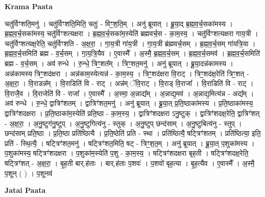 \documentclass[17pt]{extarticle}
\begin{document}
\textbf{Krama Paata} \newline

चतु॑र्विꣳशति॒मनु॑ । चतु॑र्विꣳशति॒मिति॒ चतुः॑ - विꣳ॒॒श॒ति॒म् । अनु॑ ब्रूयात् । ब्रू॒या॒द् ब्र॒ह्म॒व॒र्च॒सका॑मस्य । ब्र॒ह्म॒व॒र्च॒सका॑मस्य॒ चतु॑र्विꣳशत्यक्षरा । ब्र॒ह्म॒व॒र्च॒सका॑म॒स्येति॑ ब्रह्मवर्च॒स - का॒म॒स्य॒ । चतु॑र्विꣳशत्यक्षरा गाय॒त्री । चतु॑र्विꣳशत्यक्ष॒रेति॒ चतु॑र्विꣳशति - अ॒क्ष॒रा॒ । गा॒य॒त्री गा॑य॒त्री । गा॒य॒त्री ब्र॑ह्मवर्च॒सम् । ब्र॒ह्म॒व॒र्च॒सम् गा॑यत्रि॒या । ब्र॒ह्म॒व॒र्च॒समिति॑ ब्रह्म - व॒र्च॒सम् । गा॒य॒त्रि॒यैव । ए॒वास्मै᳚ । अ॒स्मै॒ ब्र॒ह्म॒व॒र्च॒सम् । ब्र॒ह्म॒व॒र्च॒समव॑ । ब्र॒ह्म॒व॒र्च॒समिति॑ ब्रह्म - व॒र्च॒सम् । अव॑ रुन्धे । रु॒न्धे॒ त्रिꣳ॒॒शत᳚म् । त्रिꣳ॒॒शत॒मनु॑ । अनु॑ ब्रूयात् । ब्रू॒या॒दन्न॑कामस्य । अन्न॑कामस्य त्रिꣳ॒॒शद॑क्षरा । अन्न॑काम॒स्येत्यन्न॑ - का॒म॒स्य॒ । त्रिꣳ॒॒शद॑क्षरा वि॒राट् । त्रिꣳ॒॒शद॑क्ष॒रेति॑ त्रिꣳ॒॒शत् - अ॒क्ष॒रा॒ । वि॒राडन्न᳚म् । वि॒राडिति॑ वि - राट् । अन्न॑म् ॅवि॒राट् । वि॒राड् वि॒राजा᳚ । वि॒राडिति॑ वि - राट् । वि॒राजै॒व । वि॒राजेति॑ वि - राजा᳚ । ए॒वास्मै᳚ । अ॒स्मा॒ अ॒न्नाद्य᳚म् । अ॒न्नाद्य॒मव॑ । अ॒न्नाद्य॒मित्य॑न्न - अद्य᳚म् । अव॑ रुन्धे । रु॒न्धे॒ द्वात्रिꣳ॑शतम् । द्वात्रिꣳ॑शत॒मनु॑ । अनु॑ ब्रूयात् । ब्रू॒या॒त् प्र॒ति॒ष्ठाका॑मस्य । प्र॒ति॒ष्ठाका॑मस्य॒ द्वात्रिꣳ॑शदक्षरा । प्र॒ति॒ष्ठाका॑म॒स्येति॑ प्रति॒ष्ठा - का॒म॒स्य॒ । द्वात्रिꣳ॑शदक्षरा ऽनु॒ष्टुक् । द्वात्रिꣳ॑शदक्ष॒रेति॒ द्वात्रिꣳ॑शत् - अ॒क्ष॒रा॒ । अ॒नु॒ष्टुग॑नु॒ष्टुप् । अ॒नु॒ष्टुगित्य॑नु - स्तुक् । अ॒नु॒ष्टुप् छन्द॑साम् । अ॒नु॒ष्टुबित्य॑नु - स्तुप् । छन्द॑साम् प्रति॒ष्ठा । प्र॒ति॒ष्ठा प्रति॑ष्ठित्यै । प्र॒ति॒ष्ठेति॑ प्रति - स्था । प्रति॑ष्ठित्यै॒ षट्त्रिꣳ॑शतम् । प्रति॑ष्ठित्या॒ इति॒ प्रति॑ - स्थि॒त्यै॒ । षट्त्रिꣳ॑शत॒मनु॑ । षट्त्रिꣳ॑शत॒मिति॒ षट् - त्रिꣳ॒॒श॒त॒म् । अनु॑ ब्रूयात् । ब्रू॒या॒त् प॒शुका॑मस्य । प॒शुका॑मस्य॒ षट्त्रिꣳ॑शदक्षरा । प॒शुका॑म॒स्येति॑ प॒शु - का॒म॒स्य॒ । षट्त्रिꣳ॑शदक्षरा बृह॒ती । षट्त्रिꣳ॑शदक्ष॒रेति॒ षट्त्रिꣳ॑शत् - अ॒क्ष॒रा॒ । बृ॒ह॒ती बार्.ह॑ताः । बार्.ह॑ताः प॒शवः॑ । प॒शवो॑ बृह॒त्या । बृ॒ह॒त्यैव । ए॒वास्मै᳚ । अ॒स्मै॒ प॒शून् ( ) । प॒शूनव॑ \newline

\textbf{Jatai Paata} \newline
\end{document}
